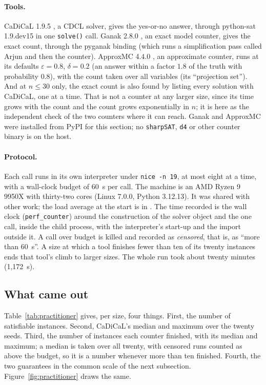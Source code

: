 \paragraph{Tools.} CaDiCaL 1.9.5 \citep{Biere2024CaDiCaL}, a CDCL solver,
gives the yes-or-no answer, through python-sat 1.9.dev15
\citep{Ignatiev2018PySAT} in one \texttt{solve()} call. Ganak 2.8.0
\citep{Sharma2019Ganak}, an exact model counter, gives the exact count,
through the pyganak binding (which runs a simplification pass called
Arjun and then the counter). ApproxMC 4.4.0 \citep{Chakraborty2013ApproxMC,
Soos2019BIRD}, an approximate counter, runs at its defaults $\varepsilon =
0.8$, $\delta = 0.2$ (an answer within a factor $1.8$ of the truth with
probability $0.8$), with the count taken over all variables (its
``projection set''). And at $n \le 30$ only, the exact count is also
found by listing every solution with CaDiCaL, one at a time. That is not
a counter at any larger size, since its time grows with the count and the
count grows exponentially in $n$; it is here as the independent check of
the two counters where it can reach. Ganak and ApproxMC were installed from PyPI for this section; no
\texttt{sharpSAT}, \texttt{d4} or other counter binary is on the host.

\paragraph{Protocol.} Each call runs in its own interpreter under
\texttt{nice -n 19}, at most eight at a time, with a wall-clock budget of
60~s per call. The machine is an AMD Ryzen 9 9950X with thirty-two cores
(Linux 7.0.0, Python 3.12.13). It was
shared with other work; the load average at the start is in
. The time recorded is the wall clock (\texttt{perf\_counter}) around the
construction of the solver object and the one call, inside the child
process, with the interpreter's start-up and the import outside it. A
call over budget is killed and recorded as \emph{censored}, that is, as
``more than 60~s''. A size at which a tool finishes fewer than ten of
its twenty instances ends that tool's climb to larger sizes. The whole
run took about twenty minutes (1,172~s).

\subsection{What came out}
\label{sec:practitioner-results}

Table~\ref{tab:practitioner} gives, per size, four things. First, the number of satisfiable
instances. Second, CaDiCaL's median and maximum over the twenty seeds. Third, the
number of instances each counter finished, with its median and maximum;
a median is taken over all twenty, with censored runs counted as above the
budget, so it is a number whenever more than ten finished. Fourth,
the two guarantees in the common scale of the next subsection.
Figure~\ref{fig:practitioner} draws the same.


